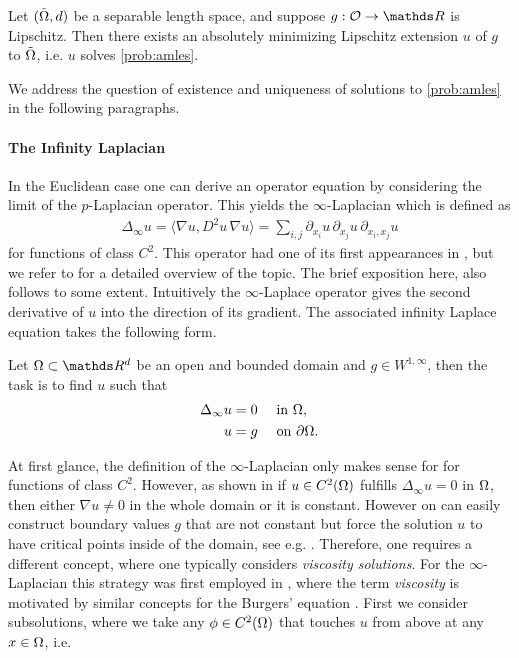 \begin{theorem}{\cite[Th. 4.3]{juutinen2002absolutely}}{}
Let $(\tilde{\Omega}, d)$ be a separable length space, and suppose $g: \conset\to\R$ is Lipschitz. Then there exists an absolutely minimizing Lipschitz extension $u$ of $g$ to $\tilde{\Omega}$, i.e. $u$ solves \cref{prob:amles}.
\end{theorem}
%
\noindent%
We address the question of existence and uniqueness of solutions to \cref{prob:amles} in the following paragraphs.
%
%
\paragraph{The Infinity Laplacian} In the Euclidean case one can derive an operator equation by considering the limit of the $p$-Laplacian operator. This yields the $\infty$-Laplacian which is defined as
%
\begin{align*}
\Delta_\infty u = \langle \nabla u, D^2 u\, \nabla u\rangle = 
\sum_{i,j} \partial_{x_i} u\, \partial_{x_j} u\, \partial_{x_i,x_j} u
\end{align*}
%
for functions of class $C^2$. This operator had one of its first appearances in \cite{aronsson1968partial}, but we refer to \cite{lindqvist2017notes} for a detailed overview of the topic. The brief exposition here, also follows \cite{lindqvist2017notes} to some extent. Intuitively the $\infty$-Laplace operator gives the second derivative of $u$ into the direction of its gradient. The associated infinity Laplace equation takes the following form.
%
\begin{problem}{}{}
Let $\domain\subset\R^d$ be an open and bounded domain and $g\in W^{1,\infty}$, then the task is to find $u$ such that
%
\begin{align*}
\Delta_\infty u &= 0\quad\text{ in }\Omega,\\
u &= g\quad \text{ on }\partial\Omega.
\end{align*}
\end{problem}
%
\noindent%
At first glance, the definition of the $\infty$-Laplacian only makes sense for for functions of class $C^2$. However, as shown in \cite{yu2006remark, aronsson1968partial} if $u\in C^2(\Omega)$ fulfills $\Delta_\infty u = 0$ in $\Omega$, then either $\nabla u \neq 0$ in the whole domain or it is constant. However on can easily construct boundary values $g$ that are not constant but force the solution $u$ to have critical points inside of the domain, see e.g. \cite{lindqvist2016notes}. Therefore, one requires a different concept, where one typically considers \emph{viscosity solutions}. For the $\infty$-Laplacian this strategy was first employed in \cite{bhattacharya1989limits}, where the term \emph{viscosity} is motivated by similar concepts for the Burgers' equation \cite{burgers1948mathematical}. First we consider subsolutions, where we take any $\phi\in C^2(\Omega)$ that touches $u$ from above at any $x\in\Omega$, i.e.

